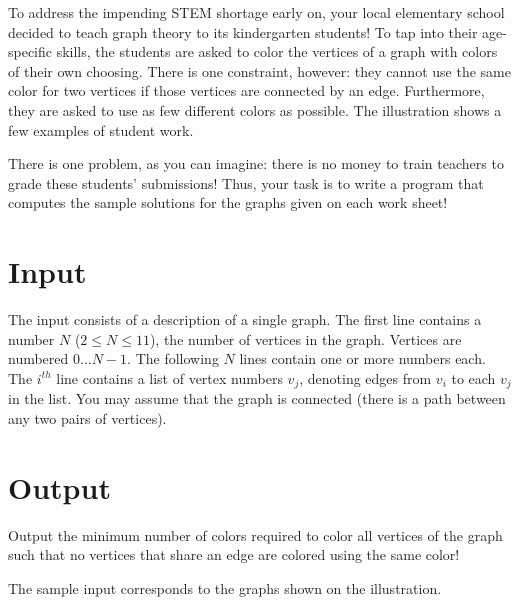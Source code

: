 

To address the impending STEM shortage early on, your local elementary school decided to
teach graph theory to its kindergarten students!   To tap into their age-specific skills, the students
are asked to color the vertices of a graph with colors of their own choosing.   
There is one constraint, however: they cannot use the same color for two vertices 
if those vertices are connected by an edge.  Furthermore, they are asked to use as few
different colors as possible.  The illustration shows a few examples of student work.

There is one problem, as you can imagine: there is no money to train teachers to grade 
these students' submissions!  
Thus, your task is to write a program that computes the sample solutions for the
graphs given on each work sheet!

\section*{Input}

The input consists of a description of a single graph. The first line contains a number $N$ 
($2 \le N \le 11$), the number of vertices in the graph.  Vertices are numbered $0 \ldots N-1$.
The following $N$ lines contain one or more numbers each.  The $i^{th}$ line contains a list
of vertex numbers ${ v_j }$, denoting edges from $v_i$ to each $v_j$ in the list.
You may assume that the graph is connected (there is a path between any two pairs of vertices).

\section*{Output}

Output the minimum number of colors required to color all vertices of the graph such
that no vertices that share an edge are colored using the same color!

The sample input corresponds to the graphs shown on the illustration.
